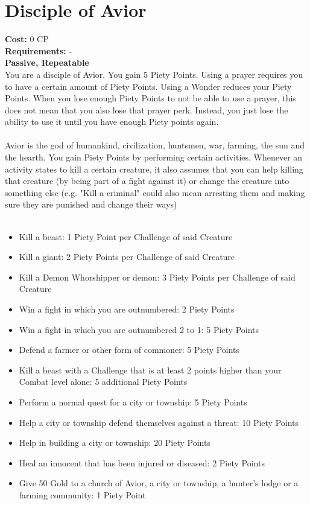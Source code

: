 \section{Disciple of Avior}
\textbf{Cost:} 0 CP\\
\textbf{Requirements:} - \\
\textbf{Passive, Repeatable}\\
You are a disciple of Avior. You gain 5 Piety Points. Using a prayer requires you to have a certain amount of Piety Points. Using a Wonder reduces your Piety Points. When you lose enough Piety Points to not be able to use a prayer, this does not mean that you also lose that prayer perk. Instead, you just lose the ability to use it until you have enough Piety points again.\\
\\
Avior is the god of humankind, civilization, huntsmen, war, farming, the sun and the hearth. You gain Piety Points by performing certain activities. Whenever an activity states to kill a certain creature, it also assumes that you can help killing that creature (by being part of a fight against it) or change the creature into something else (e.g. "Kill a criminal" could also mean arresting them and making sure they are punished and change their ways)\\
\\
\begin{itemize}
	\item Kill a beast: 1 Piety Point per Challenge of said Creature
	\item Kill a giant: 2 Piety Points per Challenge of said Creature
	\item Kill a Demon Whorshipper or demon: 3 Piety Points per Challenge of said Creature
	\item Win a fight in which you are outnumbered: 2 Piety Points
	\item Win a fight in which you are outnumbered 2 to 1: 5 Piety Points
	\item Defend a farmer or other form of commoner: 5 Piety Points
	\item Kill a beast with a Challenge that is at least 2 points higher than your Combat level alone: 5 additional Piety Points
	\item Perform a normal quest for a city or township: 5 Piety Points
	\item Help a city or township defend themselves against a threat: 10 Piety Points
	\item Help in building a city or township: 20 Piety Points
	\item Heal an innocent that has been injured or diseased: 2 Piety Points
	\item Give 50 Gold to a church of Avior, a city or township, a hunter's lodge or a farming community: 1 Piety Point
\end{itemize}

